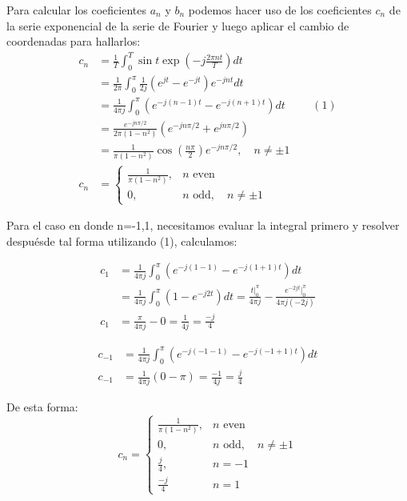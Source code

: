 \documentclass[12pt,a4paper]{report}
\begin{document}
\begin{enumerate}[label=\alph*),left=0pt]
\begin{itemize}[left=0pt]
Para calcular los coeficientes $a_n$ y $b_n$ podemos hacer uso de los coeficientes $c_n$ de la serie exponencial de la serie de Fourier y luego aplicar el cambio de coordenadas para hallarlos:
            $$
            \begin{aligned}
                c_n &= \frac{1}{T} \int_0^T \sin t \exp\left(-j\frac{2\pi n t}{T}\right) dt\\
                &= \frac{1}{2\pi} \int_0^{\pi} \frac{1}{2j}\left(e^{jt} - e^{-jt}\right) e^{-jnt} dt\\
                &= \frac{1}{4\pi j} \int_0^{\pi} \left(e^{-j(n-1)t} - e^{-j(n+1)t}\right) dt \hspace{1cm}(1)\\
                &= \frac{e^{-jn\pi/2}}{2\pi(1-n^2)} \left(e^{-jn\pi/2} + e^{jn\pi/2}\right)\\
                & = \frac{1}{\pi(1-n^2)} \cos\left(\frac{n\pi}{2}\right)e^{-jn\pi/2}, \quad n \neq \pm 1\\
                c_n &= \begin{cases}
            \frac{1}{\pi(1-n^2)}, & n \text{ even} \\[5pt]
            0, & n \text{ odd}, \quad n \neq \pm 1
            \end{cases}
            \end{aligned}
            $$

       Para el caso en donde n=-1,1, necesitamos evaluar la integral primero y resolver despuésde tal forma utilizando (1), calculamos:

       $$
       \begin{aligned}
       c_1&=\frac{1}{4\pi j}\int_0^\pi(e^{-j(1-1)}-e^{-j(1+1)t})dt\\
       &=\frac{1}{4\pi j}\int^\pi_0 (1-e^{-j2t})dt=\frac{t|^\pi_0}{4\pi j}-\frac{e^{-2jt}|^\pi_0}{4\pi j (-2j)}\\
       c_1&=\frac{\pi}{4\pi j}-0=\frac{1}{4j}=\frac{-j}{4}
       \end{aligned}
       $$
     
       $$
        \begin{aligned}
        c_{-1}&=\frac{1}{4\pi j}\int^\pi_0(e^{-j(-1-1)}-e^{-j(-1+1)t})dt\\
       c_{-1}&=\frac{1}{4\pi j}(0-\pi)=\frac{-1}{4j}=\frac{j}{4}     
        \end{aligned}
       $$

       De esta forma:
       $$
       c_n = \begin{cases}
            \frac{1}{\pi(1-n^2)}, & n \text{ even} \\[5pt]
            0, & n \text{ odd}, \quad n \neq \pm 1 \\
            \frac{j}{4}, & n=-1 \\
            \frac{-j}{4} & n=1
            \end{cases}$$


\end{itemize}
\end{enumerate}
\end{document}
